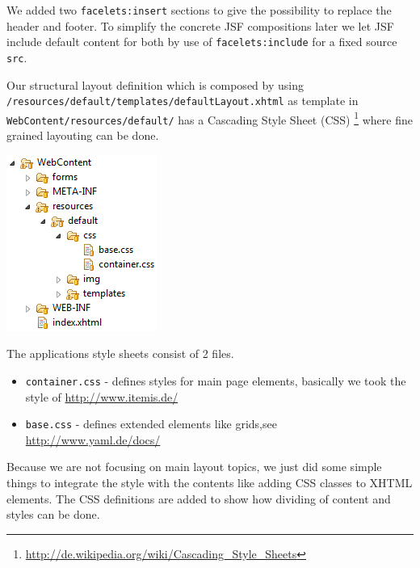 We added two \texttt{facelets:insert} sections to give the possibility to
replace the header and footer. To simplify the concrete JSF compositions later we let JSF include
default content for both by use of \texttt{facelets:include} for a fixed source
\texttt{src}.

Our structural layout definition which is composed by using
\newline\texttt{/resources/default/templates/defaultLayout.xhtml} as template in
\newline \texttt{WebContent/resources/default/} has a Cascading Style Sheet (CSS)
\footnote{\url{http://de.wikipedia.org/wiki/Cascading_Style_Sheets}} where fine
grained layouting can be done.

\includegraphics{./images/chapter02/css_template.png}

The applications style sheets consist of 2 files.

\begin{itemize}
\item \texttt{container.css} - defines styles for main page elements, basically we took
the style of \url{http://www.itemis.de/}
\item \texttt{base.css} - defines extended elements like grids,see
\url{http://www.yaml.de/docs/}
\end{itemize} 

Because we are not focusing on main layout topics, we just did some simple
things to integrate the style with the contents like adding CSS classes to XHTML elements.
The CSS definitions are added to show how dividing of content and styles
can be done.
